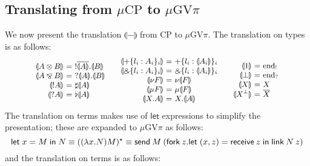 \documentclass[orivec,envcountsame]{llncs}
\makeatletter
\newcommand{\with}{\mathbin\binampersand}
\newcommand{\parr}{\mathbin\bindnasrepma}
\newcommand{\cpdual}[1]{#1^\perp}
\newcommand{\cpbang}[1]{{! #1}}
\newcommand{\cpquery}[1]{{? #1}}
\newcommand{\gvdual}[1]{\overline{#1}}
\newcommand{\gvout}[2]{{!#1.#2}}
\newcommand{\gvin}[2]{{?#1.#2}}
\newcommand{\outterm}{\mathrm{end}_!}
\newcommand{\interm}{\mathrm{end}_?}
\newcommand{\gvserver}[1]{\flat #1}
\newcommand{\gvservice}[1]{\sharp #1}
\newcommand{\mkwd}[1]{\mathsf{#1}}
\newcommand{\gvsend}[2]{\mkwd{send}\:#1\:#2}
\newcommand{\gvreceive}[1]{\mkwd{receive}\:#1}
\newcommand{\gvlet}[3]{\mkwd{let}\;#1 = #2\;\mkwd{in}\;#3}
\newcommand{\gvlink}[2]{\mkwd{link}\:#1\:#2}
\newcommand{\gvfork}[2]{\mkwd{fork}\:#1.#2}
\newcommand{\gvreceivek}[4]{\gvlet{({#1}, {#2})}{\gvreceive{#3}}{#4}}
\newcommand{\key}{\mkwd}
\newcommand{\togv}[1]{\llparenthesis #1 \rrparenthesis}
\newcommand{\topi}[1]{({#1})^\star}
\newcommand{\mucp}{$\mu\mathrm{CP}$\xspace}
\newcommand{\gvpi}{$\mu\mathrm{GV}\pi$\xspace}
\newcommand{\ba}{\begin{array}}
\newcommand{\ea}{\end{array}}
\newenvironment{eqs}{\ba{@{}r@{~}c@{~}l@{}}}{\ea}
\makeatother
\begin{document}
\subsection{Translating from \mucp to \gvpi}\label{sec:cptogvpi}

We now present the translation $\togv{-}$ from CP to \gvpi. The translation on types is as follows:
\[\small
\ba{@{}c@{\qquad}c@{\qquad}c@{}}
\begin{eqs}
\togv{A \otimes B} &=& \gvout{\gvdual{\togv{A}}}{\togv{B}} \\
\togv{A \parr B}   &=& \gvin{\togv{A}}{\togv{B}} \\
\togv{\cpbang{A}}   &=& \gvservice{\togv{A}} \\
\togv{\cpquery{A}}  &=& \gvserver{\togv{A}} \\
\end{eqs}
&
\begin{eqs}
\togv{+\{l_i:A_i\}_i}     &=& +\{l_i:\togv{A_i}\}_i  \\
\togv{\with\{l_i:A_i\}_i} &=& \with\{l_i:\togv{A_i}\}_i \\
\togv{\nu F} &=& \nu \togv{F} \\
\togv{\mu F} &=& \mu \togv{F} \\
\togv{X.A} &=& X.\togv{A} \\
\end{eqs}
&
\begin{eqs}
\togv{1}           &=& \outterm \\
\togv{\bot}              &=& \interm \\
\togv{X}            &=& X \\
\togv{\cpdual{X}}   &=& \gvdual{X} \\
\end{eqs}
\ea
\]
The translation on terms makes use of $\key{let}$ expressions to simplify the presentation; these
are expanded to \gvpi as follows:
\[\small
\gvlet{x}{M}{N} \equiv
  \topi{(\lambda x.N) M} \equiv
  \gvsend{M}{(\gvfork{z}{\gvreceivek{x}{z}{z}{\gvlink{N}{z}}})}
\]%
and the translation on terms is as follows:
\end{document}
